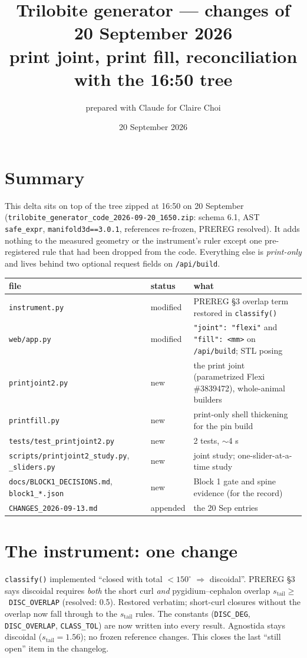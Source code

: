 \documentclass[11pt]{article}
\title{Trilobite generator --- changes of 20 September 2026\\\large print joint, print fill, reconciliation with the 16:50 tree}
\author{prepared with Claude for Claire Choi}
\date{20 September 2026}
\newcommand{\code}[1]{\texttt{#1}}
\begin{document}
\maketitle

\section*{Summary}
This delta sits on top of the tree zipped at 16:50 on 20 September (\code{trilobite\_generator\_code\_2026-09-20\_1650.zip}: schema 6.1, AST \code{safe\_expr}, \code{manifold3d==3.0.1}, references re-frozen, PREREG resolved). It adds nothing to the measured geometry or the instrument's ruler except one pre-registered rule that had been dropped from the code. Everything else is \emph{print-only} and lives behind two optional request fields on \code{/api/build}.

\begin{center}\begin{tabular}{@{}lll@{}}\toprule
file & status & what \\\midrule
\code{instrument.py} & modified & PREREG \S3 overlap term restored in \code{classify()} \\
\code{web/app.py} & modified & \code{"joint": "flexi"} and \code{"fill": <mm>} on \code{/api/build}; STL posing \\
\code{printjoint2.py} & new & the print joint (parametrized Flexi \#3839472), whole-animal builders \\
\code{printfill.py} & new & print-only shell thickening for the pin build \\
\code{tests/test\_printjoint2.py} & new & 2 tests, \(\sim\)4 s \\
\code{scripts/printjoint2\_study.py}, \code{\_sliders.py} & new & joint study; one-slider-at-a-time study \\
\code{docs/BLOCK1\_DECISIONS.md}, \code{block1\_*.json} & new & Block 1 gate and spine evidence (for the record) \\
\code{CHANGES\_2026-09-13.md} & appended & the 20 Sep entries \\\bottomrule
\end{tabular}\end{center}

\section{The instrument: one change}
\code{classify()} implemented ``closed with total \(<150^\circ\) \(\Rightarrow\) discoidal''. PREREG \S3 says discoidal requires \emph{both} the short curl \emph{and} pygidium--cephalon overlap \(s_{\mathrm{tail}}\ge\)~\code{DISC\_OVERLAP} (resolved: 0.5). Restored verbatim; short-curl closures without the overlap now fall through to the \(s_{\mathrm{tail}}\) rules. The constants (\code{DISC\_DEG}, \code{DISC\_OVERLAP}, \code{CLASS\_TOL}) are now written into every result. Agnostida stays discoidal (\(s_{\mathrm{tail}}=1.56\)); no frozen reference changes. This closes the last ``still open'' item in the changelog.
\end{document}
